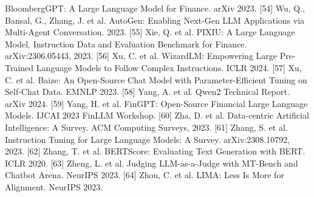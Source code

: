 \documentclass[9pt,twocolumn]{extarticle}
\begin{document}
BloombergGPT: A Large Language Model for Finance. arXiv 2023.
\protect{}\label{ref_54}{}[54] Wu, Q., Bansal, G.,
Zhang, J. et al. AutoGen: Enabling Next-Gen LLM Applications via
Multi-Agent Conversation. 2023.
\protect{}\label{ref_55}{}[55] Xie, Q. et al. PIXIU: A
Large Language Model, Instruction Data and Evaluation Benchmark for
Finance. arXiv:2306.05443, 2023.
\protect{}\label{ref_56}{}[56] Xu, C. et al. WizardLM:
Empowering Large Pre-Trained Language Models to Follow Complex
Instructions. ICLR 2024.
\protect{}\label{ref_57}{}[57] Xu, C. et al. Baize: An
Open-Source Chat Model with Parameter-Efficient Tuning on Self-Chat
Data. EMNLP 2023.
\protect{}\label{ref_58}{}[58] Yang, A. et al. Qwen2
Technical Report. arXiv 2024.
\protect{}\label{ref_59}{}[59] Yang, H. et al. FinGPT:
Open-Source Financial Large Language Models. IJCAI 2023 FinLLM Workshop.
\protect{}\label{ref_60}{}[60] Zha, D. et al.
Data-centric Artificial Intelligence: A Survey. ACM Computing Surveys,
2023.
\protect{}\label{ref_61}{}[61] Zhang, S. et al.
Instruction Tuning for Large Language Models: A Survey.
arXiv:2308.10792, 2023.
[62] Zhang, T. et al. BERTScore: Evaluating Text Generation with
BERT. ICLR 2020.
\protect{}\label{ref_63}{}[63] Zheng, L. et al. Judging
LLM-as-a-Judge with MT-Bench and Chatbot Arena. NeurIPS 2023.
\protect{}\label{ref_64}{}[64] Zhou, C. et al. LIMA:
Less Is More for Alignment. NeurIPS 2023.
\end{document}
